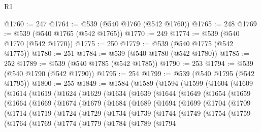\begin{lexlean}{R1}
\begin{coremodule}
@1760 := 247
@1764 := @539 (@540 @1760 (@542 @1760))
@1765 := 248
@1769 := @539 (@540 @1765 (@542 @1765))
@1770 := 249
@1774 := @539 (@540 @1770 (@542 @1770))
@1775 := 250
@1779 := @539 (@540 @1775 (@542 @1775))
@1780 := 251
@1784 := @539 (@540 @1780 (@542 @1780))
@1785 := 252
@1789 := @539 (@540 @1785 (@542 @1785))
@1790 := 253
@1794 := @539 (@540 @1790 (@542 @1790))
@1795 := 254
@1799 := @539 (@540 @1795 (@542 @1795))
@1800 := 255
@1849 := @1584
    (@1589
      (@1594
        (@1599
          (@1604
            (@1609
              (@1614
                (@1619
                  (@1624
                    (@1629
                      (@1634
                        (@1639
                          (@1644
                            (@1649
                              (@1654
                                (@1659
                                  (@1664
                                    (@1669
                                      (@1674
                                        (@1679
                                          (@1684
                                            (@1689
                                              (@1694
                                                (@1699
                                                  (@1704
                                                    (@1709
                                                      (@1714
                                                        (@1719
                                                          (@1724
                                                            (@1729
                                                              (@1734
                                                                (@1739
                                                                  (@1744
                                                                    (@1749
                                                                      (@1754
                                                                        (@1759
                                                                          (@1764
                                                                            (@1769
                                                                              (@1774
                                                                                (@1779
                                                                                  (@1784
                                                                                    (@1789
                                                                                      (@1794

\end{coremodule}
\end{lexlean}

